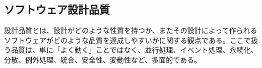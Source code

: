 \subsection{ソフトウェア設計品質}

設計品質とは、設計がどのような性質を持つか、またその設計によって作られるソフトウェアがどのような品質を達成しやすいかに関する観点である。ここで扱う品質は、単に「よく動く」ことではなく、並行処理、イベント処理、永続化、分散、例外処理、統合、安全性、変動性など、多面的である。
